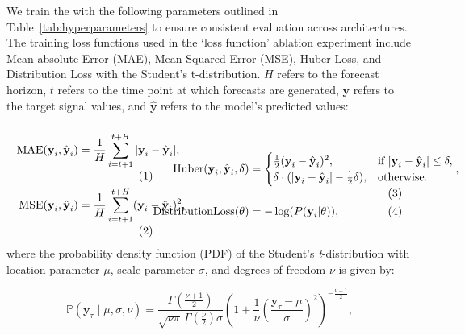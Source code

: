 We train the \Tfive with the following parameters outlined in Table~\ref{tab:hyperparameters} to ensure consistent evaluation across architectures. The training loss functions used in the `loss function' ablation experiment include Mean absolute Error (MAE), Mean Squared Error (MSE), Huber Loss, and Distribution Loss with the Student's t-distribution. $H$ refers to the forecast horizon, $t$ refers to the time point at which forecasts are generated, $\textbf{y}$ refers to the target signal values, and $\hat{\textbf{y}}$ refers to the model's predicted values:
\[
\begin{minipage}{0.35\textwidth}
\begin{align*}
    \mathrm{MAE}(\textbf{y}_i, \hat{\textbf{y}}_i) &= \frac{1}{H}\sum_{i=t+1}^{t+H}|\textbf{y}_i - \hat{\textbf{y}}_i|,\\
    \mathrm{MSE}(\textbf{y}_i, \hat{\textbf{y}}_i) &= \frac{1}{H}\sum_{i=t+1}^{t+H}(\textbf{y}_i - \hat{\textbf{y}}_i)^2,
\end{align*}
\end{minipage}%
\hfill
\begin{minipage}{0.64\textwidth}
\begin{align*}
    \mathrm{Huber}(\textbf{y}_i, \hat{\textbf{y}}_i, \delta) &= 
    \begin{cases}
    \frac{1}{2}(\textbf{y}_i - \hat{\textbf{y}}_i)^2, &\text{if } |\textbf{y}_i - \hat{\textbf{y}}_i| \leq \delta, \\
    \delta \cdot (|\textbf{y}_i - \hat{\textbf{y}}_i| - \frac{1}{2}\delta),  &\text{otherwise}.
    \end{cases}, \\
    \mathrm{DistributionLoss}(\theta) &= -\log(P(\textbf{y}_i | \theta)),
\end{align*}
\end{minipage}%
\hfill
\]
where the probability density function (PDF) of the Student's \emph{t}-distribution with location parameter \(\mu\), scale parameter \(\sigma\), and degrees of freedom \(\nu\) is given by:

\[
\mathbb{P}(\textbf{y}_\tau \mid \mu, \sigma, \nu) = \frac{\Gamma\left(\frac{\nu + 1}{2}\right)}{\sqrt{\nu \pi} \, \Gamma\left(\frac{\nu}{2}\right) \sigma} \left( 1 + \frac{1}{\nu} \left(\frac{\textbf{y}_\tau - \mu}{\sigma}\right)^2 \right)^{-\frac{\nu + 1}{2}},
\]


